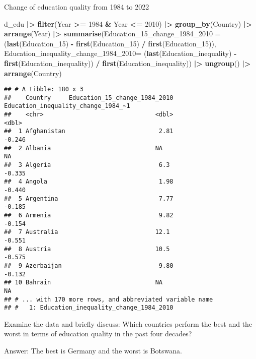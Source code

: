 \documentclass[
]{article}
\newenvironment{Shaded}{\begin{snugshade}}{\end{snugshade}}
\newcommand{\AttributeTok}[1]{\textcolor[rgb]{0.13,0.29,0.53}{#1}}
\newcommand{\DecValTok}[1]{\textcolor[rgb]{0.00,0.00,0.81}{#1}}
\newcommand{\FunctionTok}[1]{\textcolor[rgb]{0.13,0.29,0.53}{\textbf{#1}}}
\newcommand{\NormalTok}[1]{#1}
\newcommand{\SpecialCharTok}[1]{\textcolor[rgb]{0.81,0.36,0.00}{\textbf{#1}}}
\begin{document}
Change of education quality from 1984 to 2022

\begin{Shaded}
\begin{Highlighting}[]
\NormalTok{d\_edu }\SpecialCharTok{|\textgreater{}}
  \FunctionTok{filter}\NormalTok{(Year }\SpecialCharTok{\textgreater{}=} \DecValTok{1984} \SpecialCharTok{\&}\NormalTok{ Year }\SpecialCharTok{\textless{}=} \DecValTok{2010}\NormalTok{) }\SpecialCharTok{|\textgreater{}}
  \FunctionTok{group\_by}\NormalTok{(Country) }\SpecialCharTok{|\textgreater{}}
  \FunctionTok{arrange}\NormalTok{(Year) }\SpecialCharTok{|\textgreater{}}
  \FunctionTok{summarise}\NormalTok{(}\AttributeTok{Education\_15\_change\_1984\_2010 =}\NormalTok{ (}\FunctionTok{last}\NormalTok{(Education\_15) }\SpecialCharTok{{-}} \FunctionTok{first}\NormalTok{(Education\_15) }\SpecialCharTok{/} \FunctionTok{first}\NormalTok{(Education\_15)), }\AttributeTok{Education\_inequality\_change\_1984\_2010=}\NormalTok{  (}\FunctionTok{last}\NormalTok{(Education\_inequality) }\SpecialCharTok{{-}} \FunctionTok{first}\NormalTok{(Education\_inequality)) }\SpecialCharTok{/} \FunctionTok{first}\NormalTok{(Education\_inequality)) }\SpecialCharTok{|\textgreater{}}
  \FunctionTok{ungroup}\NormalTok{() }\SpecialCharTok{|\textgreater{}}
  \FunctionTok{arrange}\NormalTok{(Country)}
\end{Highlighting}
\end{Shaded}

\begin{verbatim}
## # A tibble: 180 x 3
##    Country     Education_15_change_1984_2010 Education_inequality_change_1984_~1
##    <chr>                               <dbl>                               <dbl>
##  1 Afghanistan                          2.81                              -0.246
##  2 Albania                             NA                                 NA    
##  3 Algeria                              6.3                               -0.335
##  4 Angola                               1.98                              -0.440
##  5 Argentina                            7.77                              -0.185
##  6 Armenia                              9.82                              -0.154
##  7 Australia                           12.1                               -0.551
##  8 Austria                             10.5                               -0.575
##  9 Azerbaijan                           9.80                              -0.132
## 10 Bahrain                             NA                                 NA    
## # ... with 170 more rows, and abbreviated variable name
## #   1: Education_inequality_change_1984_2010
\end{verbatim}

Examine the data and briefly discuss: Which countries perform the best
and the worst in terms of education quality in the past four decades?

Answer: The best is Germany and the worst is Botswana.
\end{document}
